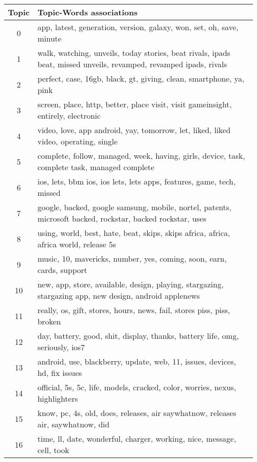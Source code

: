 \begin{table}
  \begin{tabular}{c p{16cm}} \toprule
    Topic & Topic-Words associations \\ \midrule
    0     & app, latest, generation, version, galaxy, won, set, oh, save, minute \\ \midrule
    1     & walk, watching, unveils, today stories, beat rivals, ipads beat, missed unveils, revamped, revamped ipads, rivals \\ \midrule
    2     & perfect, case, 16gb, black, gt, giving, clean, smartphone, ya, pink \\ \midrule
    3     & screen, place, http, better, place visit, visit gameinsight, entirely, electronic \\ \midrule
    4     & video, love, app android, yay, tomorrow, let, liked, liked video, operating, single \\ \midrule
    5     & complete, follow, managed, week, having, girls, device, task, complete task, managed complete \\ \midrule
    6     & ios, lets, bbm ios, ios lets, lets apps, features, game, tech, missed \\ \midrule
    7     & google, backed, google samsung, mobile, nortel, patents, microsoft backed, rockstar, backed rockstar, uses \\ \midrule
    8     & using, world, best, hate, beat, skips, skips africa, africa, africa world, release 5s \\ \midrule
    9     & music, 10, mavericks, number, yes, coming, soon, earn, cards, support \\ \midrule
    10    & new, app, store, available, design, playing, stargazing, stargazing app, new design, android applenews \\ \midrule
    11    & really, os, gift, stores, hours, news, fail, stores piss, piss, broken \\ \midrule
    12    & day, battery, good, shit, display, thanks, battery life, omg, seriously, ios7 \\ \midrule
    13    & android, use, blackberry, update, web, 11, issues, devices, hd, fix issues \\ \midrule
    14    & official, 5s, 5c, life, models, cracked, color, worries, nexus, highlighters \\ \midrule
    15    & know, pc, 4s, old, does, releases, air saywhatnow, releases air, saywhatnow, did \\ \midrule
    16    & time, ll, date, wonderful, charger, working, nice, message, cell, took \\ \midrule

\end{tabular}
\end{table}
